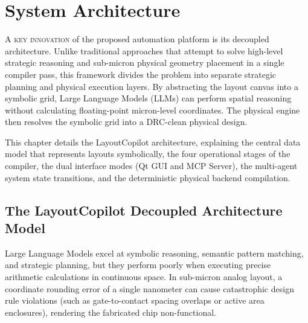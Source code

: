 
\chapter{System Architecture}
\label{ch:system_arch}

\lettrine[lines=3]{A}{ key innovation} of the proposed automation platform is its decoupled architecture. Unlike traditional approaches that attempt to solve high-level strategic reasoning and sub-micron physical geometry placement in a single compiler pass, this framework divides the problem into separate strategic planning and physical execution layers. By abstracting the layout canvas into a symbolic grid, Large Language Models (LLMs) can perform spatial reasoning without calculating floating-point micron-level coordinates. The physical engine then resolves the symbolic grid into a DRC-clean physical design.

This chapter details the LayoutCopilot architecture, explaining the central data model that represents layouts symbolically, the four operational stages of the compiler, the dual interface modes (Qt GUI and MCP Server), the multi-agent system state transitions, and the deterministic physical backend compilation.

\section[Decoupled Architecture Model]{The LayoutCopilot Decoupled Architecture Model}
\label{sec:arch_model}

Large Language Models excel at symbolic reasoning, semantic pattern matching, and strategic planning, but they perform poorly when executing precise arithmetic calculations in continuous space. In sub-micron analog layout, a coordinate rounding error of a single nanometer can cause catastrophic design rule violations (such as gate-to-contact spacing overlaps or active area enclosures), rendering the fabricated chip non-functional. 


